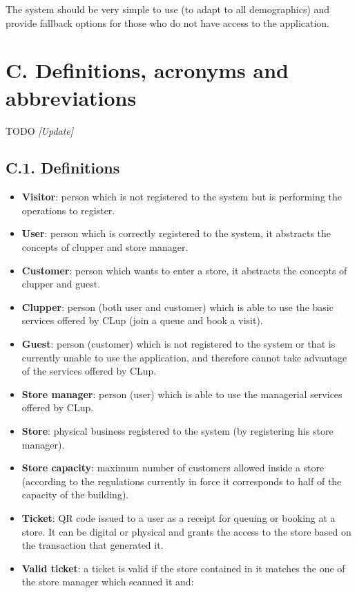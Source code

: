 The system should be very simple to use (to adapt to all demographics) and provide fallback options for those who do not have access to the application.

\section{C. Definitions, acronyms and abbreviations}
TODO \emph{[Update]}

\subsection{C.1. Definitions}

\begin{itemize}
\item
  \textbf{Visitor}: person which is not registered to the system but is performing the operations to register.
\item
  \textbf{User}: person which is correctly registered to the system, it abstracts the concepts of clupper and store manager.
\item
  \textbf{Customer}: person which wants to enter a store, it abstracts the concepts of clupper and guest.
\item
  \textbf{Clupper}: person (both user and customer) which is able to use the basic services offered by CLup (join a queue and book a visit).
\item
  \textbf{Guest}: person (customer) which is not registered to the system or that is currently unable to use the application, and therefore cannot take advantage of the services offered by CLup.
\item
  \textbf{Store manager}: person (user) which is able to use the managerial services offered by CLup.
\item
  \textbf{Store}: physical business registered to the system (by registering his store manager).
\item
  \textbf{Store capacity}: maximum number of customers allowed inside a store (according to the regulations currently in force it corresponds to half of the capacity of the building).
\item
  \textbf{Ticket}: QR code issued to a user as a receipt for queuing or booking at a store. It can be digital or physical and grants the access to the store based on the transaction that generated it.
\item
  \textbf{Valid ticket}: a ticket is valid if the store contained in it matches the one of the store manager which scanned it and:

\end{itemize}
